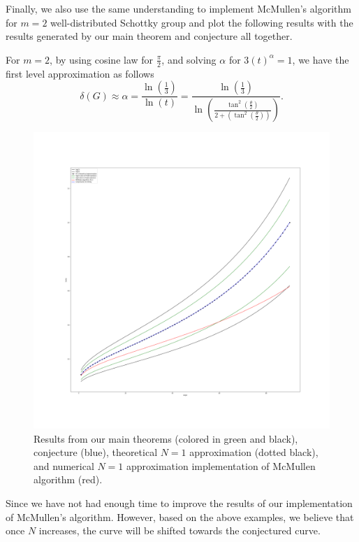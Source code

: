 \documentclass[12pt,oneside]{sfsuthesis}
\theoremstyle{plain} %
\theoremstyle{definition}  %
\theoremstyle{remark}  %
\theoremstyle{plain}
\begin{document}
{Finally, we also use the same understanding to implement McMullen's algorithm for $m=2$ well-distributed Schottky group and plot the following results with the results generated by our main theorem and conjecture all together.

For $m=2$, by using cosine law for $\frac{\pi}{2}$, and solving $\alpha$ for $3(t)^\alpha=1$, we have the first level approximation as follows
$$
\delta(G)\approx \alpha=\frac{\ln\left(\frac{1}{3}\right)}{\ln\left(t \right)}
=\frac{\ln\left(\frac{1}{3}\right)}{\ln\left(\frac{\tan^2\left(\frac{\theta}{2}\right)}{2+\left(\tan^2\left(\frac{\theta}{2}\right)\right)} \right)}.
$$


\begin{figure}[H]
\centering
\includegraphics[width=1\textwidth]{Results from our main theorem, conjecture, and implementation of McMullen algorithm.png}
\caption{Results from our main theorems (colored in green and black), conjecture (blue), theoretical $N=1$ approximation (dotted black), and numerical $N=1$ approximation implementation of McMullen algorithm (red).}
\end{figure}

Since we have not had enough time to improve the results of our implementation of McMullen's algorithm. However, based on the above examples, we believe that once $N$ increases, the curve will be shifted towards the conjectured curve.

}
\end{document}
